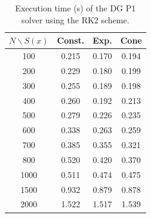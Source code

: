 \begin{table}[h!]
\centering
\begin{tabular}{c ccc}
\hline
$N \backslash S(x)$ & Const. & Exp. & Cone \\
\hline
100 & 0.215 & 0.170 & 0.194 \\
200 & 0.229 & 0.180 & 0.199 \\
300 & 0.255 & 0.189 & 0.198 \\
400 & 0.260 & 0.192 & 0.213 \\
500 & 0.279 & 0.226 & 0.235 \\
600 & 0.338 & 0.263 & 0.259 \\
700 & 0.385 & 0.355 & 0.321 \\
800 & 0.520 & 0.420 & 0.370 \\
1000 & 0.511 & 0.474 & 0.475 \\
1500 & 0.932 & 0.879 & 0.878 \\
2000 & 1.522 & 1.517 & 1.539 \\
\hline
\end{tabular}
\caption{Execution time (s) of the DG P1 solver using the RK2 scheme.}
\label{tab:performance-rk2}
\end{table}
